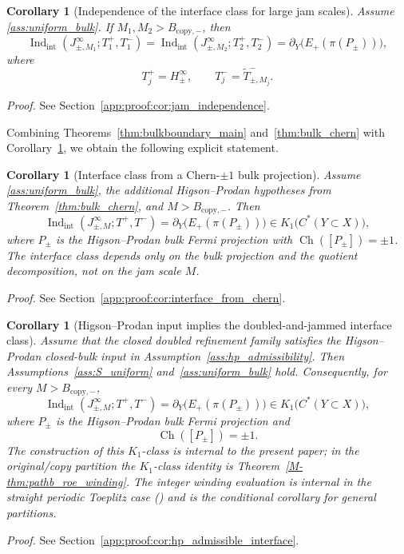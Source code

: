 \documentclass[11pt]{article}
\numberwithin{equation}{section}
\newtheorem{corollary}[theorem]{Corollary}
\theoremstyle{definition}
\theoremstyle{remark}
\newcommand{\proofref}[1]{%
  \par\noindent\emph{Proof.} See Section~\ref{#1}.\par\medskip
}
\newcommand{\proofappendixref}[1]{\proofref{#1}}
\newcommand{\Indint}{\operatorname{Ind}_{\mathrm{int}}}
\newcommand{\Ch}{\operatorname{Ch}}
\begin{document}
\begin{corollary}[Independence of the interface class for large jam scales]\label{cor:jam_independence}
Assume \ref{ass:uniform_bulk}. If $M_1,M_2>B_{\mathrm{copy},-}$, then
\[
\Indint(J_{\pm,M_1}^\infty;T_1^+,T_1^-)
=
\Indint(J_{\pm,M_2}^\infty;T_2^+,T_2^-)
=
\partial_Y\!\bigl(E_+(\pi(P_\pm))\bigr),
\]
where
\[
T_j^+=H_\pm^\infty,
\qquad
T_j^-=\widetilde T^-_{\pm,M_j}.
\]
\end{corollary}
\proofappendixref{app:proof:cor:jam_independence}





Combining Theorems~\ref{thm:bulkboundary_main} and~\ref{thm:bulk_chern} with
Corollary~\ref{cor:jam_independence}, we obtain the following explicit statement.

\begin{corollary}[Interface class from a Chern-$\pm1$ bulk projection]\label{cor:interface_from_chern}
Assume \ref{ass:uniform_bulk}, the additional Higson--Prodan hypotheses from
Theorem~\ref{thm:bulk_chern}, and $M>B_{\mathrm{copy},-}$. Then
\[
\Indint(J_{\pm,M}^\infty;T^+,T^-)
=
\partial_Y\!\bigl(E_+(\pi(P_\pm))\bigr)
\in K_1\!\bigl(C^*(Y\subset X)\bigr),
\]
where $P_\pm$ is the Higson--Prodan bulk Fermi projection with $\Ch([P_\pm])=\pm1$. The interface
class depends only on the bulk projection and the quotient decomposition, not on the jam scale $M$.
\end{corollary}
\proofappendixref{app:proof:cor:interface_from_chern}


\begin{corollary}[Higson--Prodan input implies the doubled-and-jammed interface class]\label{cor:hp_admissible_interface}
Assume that the closed doubled refinement family satisfies the Higson--Prodan closed-bulk input in
Assumption~\ref{ass:hp_admissibility}. Then
Assumptions~\ref{ass:S_uniform} and~\ref{ass:uniform_bulk} hold.
Consequently, for every $M>B_{\mathrm{copy},-}$,
\[
\Indint(J_{\pm,M}^\infty;T^+,T^-)
=
\partial_Y\!\bigl(E_+(\pi(P_\pm))\bigr)
\in K_1\!\bigl(C^*(Y\subset X)\bigr),
\]
where $P_\pm$ is the Higson--Prodan bulk Fermi projection and
\[
\Ch([P_\pm])=\pm1.
\]
The construction of this $K_1$-class is internal to the present paper; in the original/copy
partition the $K_1$-class identity is Theorem~\ref{M-thm:pathb_roe_winding}. The integer
winding evaluation is internal in the straight periodic Toeplitz case
() and is the conditional corollary
 for general partitions.
\end{corollary}
\proofappendixref{app:proof:cor:hp_admissible_interface}
\end{document}
